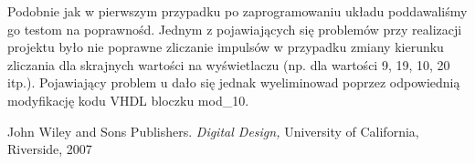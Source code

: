 \documentclass{classrep}
\begin{document}
Podobnie jak w pierwszym przypadku po zaprogramowaniu
układu poddawaliśmy go testom na poprawnośd. Jednym z pojawiających się problemów przy
realizacji projektu było nie poprawne zliczanie impulsów w przypadku zmiany kierunku zliczania dla
skrajnych wartości na wyświetlaczu (np. dla wartości 9, 19, 10, 20 itp.). Pojawiający problem u dało
się jednak wyeliminowad poprzez odpowiednią modyfikację kodu VHDL bloczku mod\_10.




\begin{thebibliography}{0}
   John Wiley and Sons Publishers.
    \textsl{Digital Design,} University of California, Riverside, 2007
\end{thebibliography}
\end{document}

